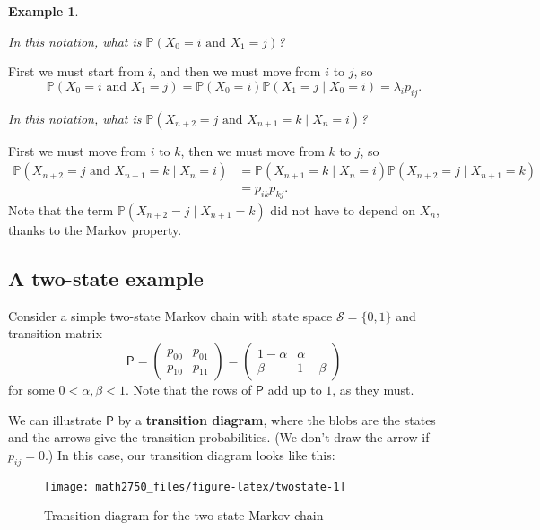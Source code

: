 \documentclass[
  a4paper,
]{article}
\theoremstyle{definition}
\theoremstyle{definition}
\newtheorem{example}{Example}[section]
\theoremstyle{definition}
\theoremstyle{remark}
\begin{document}
\begin{example}
\protect\hypertarget{exm:mcex}{}\label{exm:mcex}

\emph{In this notation, what is \(\mathbb P(X_0 = i \text{ and } X_1 = j)\)?}

First we must start from \(i\), and then we must move from \(i\) to \(j\), so
\[ \mathbb P(X_0 = i \text{ and } X_1 = j) = \mathbb P(X_0 = i)\mathbb P(X_1 = j \mid X_0 = i) = \lambda_i p_{ij} . \]

\emph{In this notation, what is \(\mathbb P(X_{n+2} = j \text{ and } X_{n+1} = k \mid X_n = i)\)?}

First we must move from \(i\) to \(k\), then we must move from \(k\) to \(j\), so
\begin{align*}
\mathbb P(X_{n+2} = j \text{ and } X_{n+1} = k \mid X_n = i)
&= \mathbb P(X_{n+1} = k \mid X_n = i)\mathbb P(X_{n+2} = j \mid X_{n+1} = k) \\
&= p_{ik}p_{kj} .
\end{align*}
Note that the term \(\mathbb P(X_{n+2} = j \mid X_{n+1} = k)\) did not have to depend on \(X_n\), thanks to the Markov property.

\end{example}

\hypertarget{S05-example}{%
\subsection{A two-state example}\label{S05-example}}

Consider a simple two-state Markov chain with state space \(\mathcal S = \{0,1\}\) and transition matrix
\[ \mathsf P = \begin{pmatrix} p_{00} & p_{01} \\ p_{10} & p_{11} \end{pmatrix} = \begin{pmatrix} 1-\alpha & \alpha \\ \beta & 1-\beta \end{pmatrix}  \]
for some \(0 < \alpha, \beta < 1\). Note that the rows of \(\mathsf P\) add up to \(1\), as they must.

We can illustrate \(\mathsf P\) by a \textbf{transition diagram}, where the blobs are the states and the arrows give the transition probabilities. (We don't draw the arrow if \(p_{ij} = 0\).) In this case, our transition diagram looks like this:

\begin{figure}

{\centering \texttt{[image: math2750\_files/figure-latex/twostate-1]} 

}

\caption{Transition diagram for the two-state Markov chain}\label{fig:twostate}
\end{figure}
\end{document}
